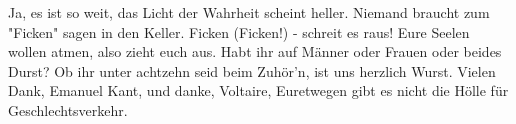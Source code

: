 \begin{guitar}
	Ja, es ist so weit, das Licht der Wahrheit scheint heller.
	Niemand braucht zum "Ficken" sagen in den Keller.
	Ficken (Ficken!) - schreit es raus!
	Eure Seelen wollen atmen, also zieht euch aus.
	Habt ihr auf Männer oder Frauen oder beides Durst?
	Ob ihr unter achtzehn seid beim Zuhör'n, ist uns herzlich Wurst.
	Vielen Dank, Emanuel Kant, und danke, Voltaire,
	Euretwegen gibt es nicht die Hölle für Geschlechtsverkehr.
	
	 
\end{guitar}
